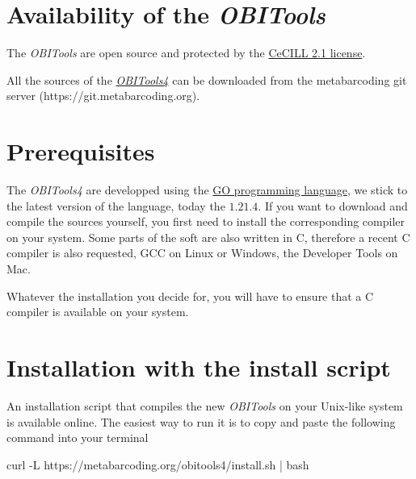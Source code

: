 \documentclass[
  letterpaper,
  DIV=11,
  numbers=noendperiod]{scrreprt}
\newenvironment{Shaded}{\begin{snugshade}}{\end{snugshade}}
\newcommand{\AttributeTok}[1]{\textcolor[rgb]{0.40,0.45,0.13}{#1}}
\newcommand{\ExtensionTok}[1]{\textcolor[rgb]{0.00,0.23,0.31}{#1}}
\newcommand{\FunctionTok}[1]{\textcolor[rgb]{0.28,0.35,0.67}{#1}}
\newcommand{\KeywordTok}[1]{\textcolor[rgb]{0.00,0.23,0.31}{#1}}
\newcommand{\NormalTok}[1]{\textcolor[rgb]{0.00,0.23,0.31}{#1}}
\begin{document}
\hypertarget{availability-of-the-obitools}{%
\section{\texorpdfstring{Availability of the
\emph{OBITools}}{Availability of the OBITools}}\label{availability-of-the-obitools}}

The \emph{OBITools} are open source and protected by the
\href{http://www.cecill.info/licences/Licence_CeCILL_V2.1-en.html}{CeCILL
2.1 license}.

All the sources of the
\href{http://metabarcoding.org/obitools4}{\emph{OBITools4}} can be
downloaded from the metabarcoding git server
(https://git.metabarcoding.org).

\hypertarget{prerequisites}{%
\section{Prerequisites}\label{prerequisites}}

The \emph{OBITools4} are developped using the \href{https://go.dev/}{GO
programming language}, we stick to the latest version of the language,
today the \(1.21.4\). If you want to download and compile the sources
yourself, you first need to install the corresponding compiler on your
system. Some parts of the soft are also written in C, therefore a recent
C compiler is also requested, GCC on Linux or Windows, the Developer
Tools on Mac.

Whatever the installation you decide for, you will have to ensure that a
C compiler is available on your system.

\hypertarget{installation-with-the-install-script}{%
\section{Installation with the install
script}\label{installation-with-the-install-script}}

An installation script that compiles the new \emph{OBITools} on your
Unix-like system is available online. The easiest way to run it is to
copy and paste the following command into your terminal

\begin{Shaded}
\begin{Highlighting}[]
\ExtensionTok{curl} \AttributeTok{{-}L}\NormalTok{ https://metabarcoding.org/obitools4/install.sh }\KeywordTok{|} \FunctionTok{bash}
\end{Highlighting}
\end{Shaded}
\end{document}

